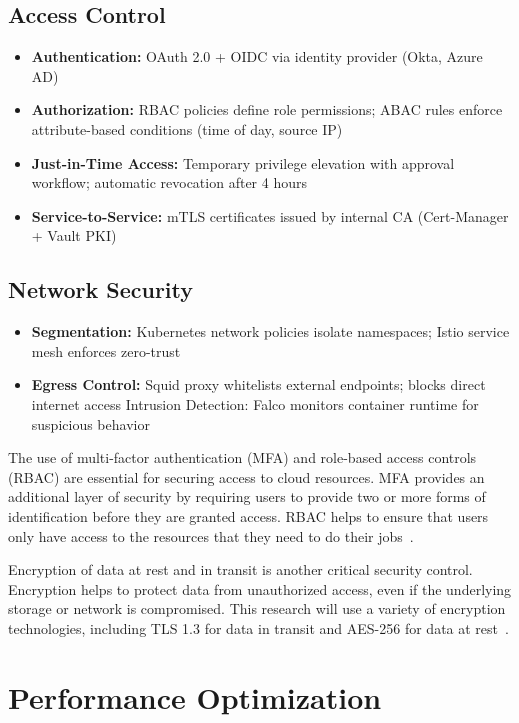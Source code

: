 \subsection{Access Control}
\begin{itemize}
    \item \textbf{Authentication:} OAuth 2.0 + OIDC via identity provider (Okta, Azure AD)
    \item \textbf{Authorization:} RBAC policies define role permissions; ABAC rules enforce attribute-based conditions (time of day, source IP)
    \item \textbf{Just-in-Time Access:} Temporary privilege elevation with approval workflow; automatic revocation after 4 hours
    \item \textbf{Service-to-Service:} mTLS certificates issued by internal CA (Cert-Manager + Vault PKI)
\end{itemize}

\subsection{Network Security}
\begin{itemize}
    \item \textbf{Segmentation:} Kubernetes network policies isolate namespaces; Istio service mesh enforces zero-trust
    \item \textbf{Egress Control:} Squid proxy whitelists external endpoints; blocks direct internet access
Intrusion Detection: Falco monitors container runtime for suspicious behavior
\end{itemize}

The use of multi-factor authentication (MFA) and role-based access controls (RBAC) are essential for securing access to cloud resources. MFA provides an additional layer of security by requiring users to provide two or more forms of identification before they are granted access. RBAC helps to ensure that users only have access to the resources that they need to do their jobs~\cite{checkpoint2024mfa}.

Encryption of data at rest and in transit is another critical security control. Encryption helps to protect data from unauthorized access, even if the underlying storage or network is compromised. This research will use a variety of encryption technologies, including TLS 1.3 for data in transit and AES-256 for data at rest~\cite{hivenet2024encryption}.

\section{Performance Optimization}\label{sec:arch-performance}
